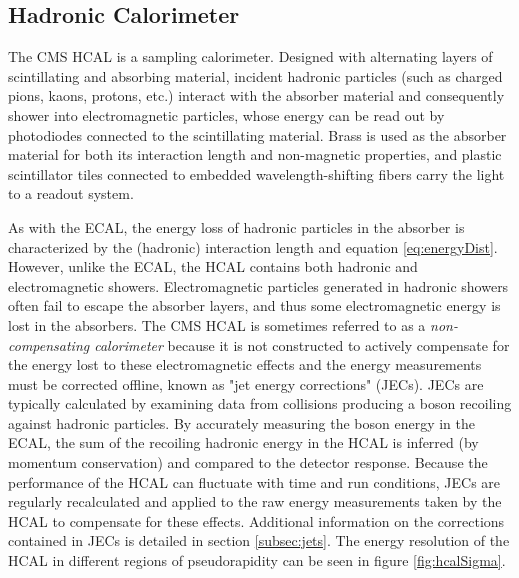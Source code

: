 \subsection{Hadronic Calorimeter}
\label{subsec:hcal}
The CMS HCAL is a sampling calorimeter. Designed with alternating layers of scintillating and absorbing material, incident hadronic particles (such as charged pions, kaons, protons, etc.) interact with the absorber material and consequently shower into electromagnetic particles, whose energy can be read out by photodiodes connected to the scintillating material. Brass is used as the absorber material for both its interaction length and non-magnetic properties, and plastic scintillator tiles connected to embedded wavelength-shifting fibers carry the light to a readout system.

As with the ECAL, the energy loss of hadronic particles in the absorber is characterized by the (hadronic) interaction length and equation \ref{eq:energyDist}. However, unlike the ECAL, the HCAL contains both hadronic and electromagnetic showers. Electromagnetic particles generated in hadronic showers  often fail to escape the absorber layers, and thus some electromagnetic energy is lost in the absorbers. The CMS HCAL is sometimes referred to as a {\it non-compensating calorimeter} because it is not constructed to actively compensate for the energy lost to these electromagnetic effects and the energy measurements must be corrected offline, known as "jet energy corrections" (JECs).  JECs are typically calculated by examining data from collisions producing a boson recoiling against  hadronic particles. By accurately measuring the boson energy in the ECAL, the sum of the recoiling hadronic energy in the HCAL is inferred (by momentum conservation) and compared to the detector response. Because the performance of the HCAL can fluctuate with time and run conditions, JECs are regularly recalculated and applied to the raw energy measurements taken by the HCAL to compensate for these effects. Additional information on the corrections contained in JECs is detailed in section \ref{subsec:jets}. The energy resolution of the HCAL in different regions of pseudorapidity can be seen in figure \ref{fig:hcalSigma}.
